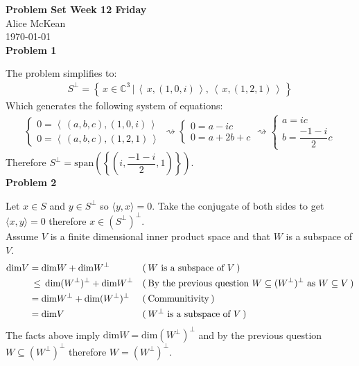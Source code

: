 \documentclass[fleqn]{article}
\newcommand{\squig}[0]{\ensuremath{\rightsquigarrow}}
\newcommand{\problem}[1]{\large\textbf{Problem #1}\normalsize}
\newcommand{\evidence}[1]{\ensuremath{(\hspace{0.2em} \text{#1} \hspace{0.2em})}}
\newcommand{\relation}[1]{\ensuremath{\hspace{0.2em} {{} #1 {}} \hspace{0.2em}}}
\begin{document}
\noindent\Large\textbf{Problem Set Week 12 Friday} \\
\normalsize
Alice McKean \\
\today \\

\problem{1}

The problem simplifies to:
\begin{align*}
  S^\bot =
  \left \{ \, x \in \mathbb{C}^3 \, | \, \left \langle \, x, (1, 0, i) \, \right \rangle , \,
                                         \left \langle \, x, (1, 2, 1) \, \right \rangle \, \right \}
\end{align*}
Which generates the following system of equations:
\begin{align*}
\begin{cases}
  0 = \left \langle \, (a, b, c), (1, 0, i) \, \right \rangle \\
  0 = \left \langle \, (a, b, c), (1, 2, 1) \, \right \rangle
\end{cases}
\squig
\begin{cases}
  0 = a - i c \\
  0 = a + 2b + c
\end{cases}
\squig
\begin{cases}
  a = i c \\
  b = \dfrac{-1 - i}{2} c
\end{cases}
\end{align*}
Therefore
$S^\bot =
\text{span}\left (\left \{ \left (i, \dfrac{-1 - i}{2}, 1 \right ) \right \} \right)$. \\

\problem{2}

Let $x \in S$ and $y \in S^\bot$ so $\langle y, x \rangle = 0$. Take the
conjugate of both sides to get $\langle x, y \rangle = 0$ therefore $x \in
(S^\bot)^\bot$. \\ 


Assume $V$ is a finite dimensional inner product space and that $W$ is a
subspace of $V$.
\begin{align*}
  \text{dim} V &= \text{dim} W + \text{dim} W^\bot 
               && \evidence{$W$ is a subspace of $V$} \\
               &\relation{\leq} \text{dim} (W^\bot)^\bot + \text{dim} W^\bot
               && \evidence{By the previous question $W \subseteq (W^\bot)^\bot$ as $W \subseteq V$} \\
               &= \text{dim} W^\bot + \text{dim} (W^\bot)^\bot
               && \evidence{Communitivity} \\
               &= \text{dim} V
               && \evidence{$W^\bot$ is a subspace of $V$}
\end{align*}
The facts above imply
$\text{dim} W = \text{dim} (W^\bot)^\bot$ and by the previous question $W
\subseteq (W^\bot)^\bot$ therefore $W = (W^\bot)^\bot$. \\
\end{document}
